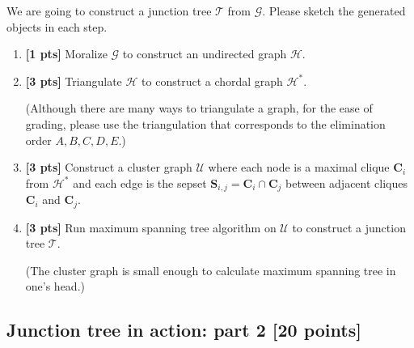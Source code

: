 \documentclass[12pt]{article}
\newcommand{\Gcal}{\mathcal{G}}
\newcommand{\Hcal}{\mathcal{H}}
\newcommand{\Ucal}{\mathcal{U}}
\newcommand{\Tcal}{\mathcal{T}}
\newcommand{\Cbs}{\boldsymbol{C}}
\newcommand{\Sbs}{\boldsymbol{S}}
\begin{document}
We are going to construct a junction tree $ \Tcal $ from $ \Gcal $.
Please sketch the generated objects in each step.

\begin{enumerate}
\item \textbf{[1 pts]} Moralize $ \Gcal $ to construct an undirected graph $ \Hcal $.



\item \textbf{[3 pts]} Triangulate $ \Hcal $ to construct a chordal graph $ \Hcal^* $. 

(Although there are many ways to triangulate a graph, for the ease of grading, please use the triangulation that corresponds to the elimination order $ A, B, C, D, E $.)


\item \textbf{[3 pts]} Construct a cluster graph $ \Ucal $ where each node is a maximal clique $ \Cbs_i $ from $ \Hcal^* $ and each edge is the sepset $ \Sbs_{i,j} = \Cbs_i \cap \Cbs_j $ between adjacent cliques $ \Cbs_i $ and $ \Cbs_j $. 




\item \textbf{[3 pts]} Run maximum spanning tree algorithm on $ \Ucal $ to construct a junction tree $ \Tcal $. 

(The cluster graph is small enough to calculate maximum spanning tree in one's head.)


\end{enumerate}



\subsection{Junction tree in action: part 2 [20 points]}
\end{document}
